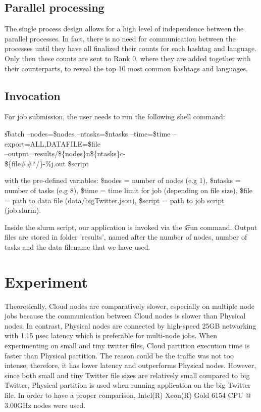 \documentclass[11pt]{article}
\begin{document}
\subsection{Parallel processing}
The single process design allows for a high level of independence between the parallel processes. In fact, there is no need for communication between the processes until they have all finalized their counts for each hashtag and language. Only then these counts are sent to Rank 0, where they are added together with their counterparts, to reveal the top 10 most common hashtags and languages.

\subsection{Invocation}

For job submission, the user needs to run the following shell command:
\begin{flushleft}
\t sbatch --nodes=\$nodes --ntasks=\$ntasks --time=\$time --export=ALL,DATAFILE=\$file\\ --output=results/\$\{nodes\}n\$\{ntasks\}c-\\\$\{file\#\#*/\}-\%j.out \$script
\end{flushleft}
with the pre-defined variables: \$nodes = number of nodes (e.g 1), \$ntasks = number of tasks (e.g 8), \$time = time limit for job (depending on file size), \$file = path to data file (data/bigTwitter.json), \$script = path to job script (job.slurm).

Inside the slurm script, our application is invoked via the \t srun command. Output files are stored in folder 'results', named after the number of nodes, number of tasks and the data filename that we have used.

\section{Experiment}

Theoretically, Cloud nodes are comparatively slower, especially on multiple node jobs because the communication between Cloud nodes is slower than Physical nodes. In contrast, Physical nodes are connected by high-speed 25GB networking with 1.15 µsec latency which is preferable for multi-node jobs. When experimenting on small and tiny twitter files, Cloud partition execution time is faster than Physical partition. The reason could be the traffic was not too intense; therefore, it has lower latency and outperforms Physical nodes.  However, since both small and tiny Twitter file sizes are relatively small compared to big Twitter, Physical partition is used when running application on the big Twitter file. In order to have a proper comparison, Intel(R) Xeon(R) Gold 6154 CPU @ 3.00GHz nodes were used.
\end{document}
